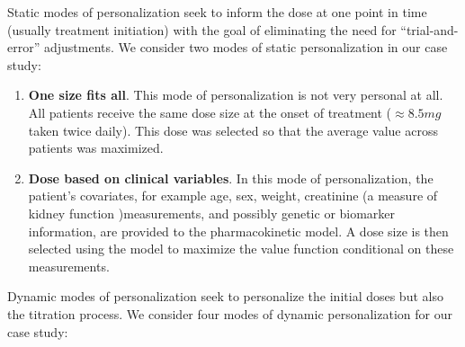 Static modes of personalization seek to inform the dose at one point in time (usually treatment initiation) with the goal of eliminating the need for ``trial-and-error'' adjustments.  We consider two modes of static personalization in our case study:

\begin{enumerate}
	\item \textbf{One size fits all}.  This mode of personalization is not very personal at all.  All patients receive the same dose size at the onset of treatment ($\approx8.5 mg$ taken twice daily). This dose was selected so that the average value across patients was maximized.  
	\item \textbf{Dose based on clinical variables}.  In this mode of personalization, the patient's covariates, for example age, sex, weight, creatinine (a measure of kidney function )measurements, and possibly genetic or biomarker information, are provided to the pharmacokinetic model.  A dose size is then selected using the model to maximize the value function conditional on these measurements.
\end{enumerate}

\noindent Dynamic modes of personalization seek to personalize the initial doses but also the titration process.  We consider four modes of dynamic personalization for our case study:

